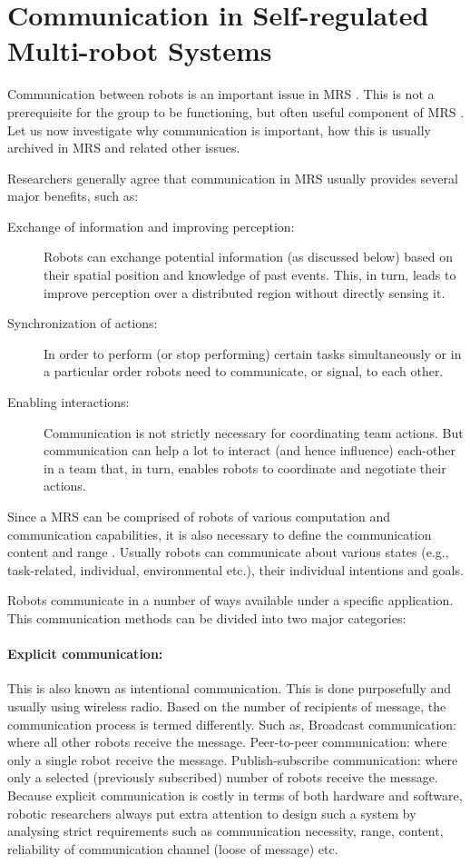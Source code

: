 \section{Communication in Self-regulated Multi-robot Systems}
Communication between robots is an  important issue in MRS \cite{Arkin1998}. This is not a prerequisite for the group to be functioning, but often useful component of MRS \cite{Mataric2007}. Let us now investigate why communication is important, how this is usually archived in MRS and related other issues.

Researchers generally agree that communication in MRS usually provides several major benefits, such as:

\begin{description}
\item[Exchange of information and improving perception:]
Robots  can exchange potential information (as discussed below) based on their spatial position and knowledge of past events. This, in turn, leads to improve perception over a distributed region without directly sensing it.
\item[Synchronization of actions:]
In order to perform (or stop performing) certain tasks simultaneously or in a particular order robots need to communicate, or signal, to each other. 
\item[Enabling interactions:]
Communication is not strictly necessary for coordinating team actions. But  communication can help a lot to interact (and hence influence) each-other in a team that, in turn, enables robots to coordinate and negotiate their actions.
\end{description}

Since a MRS  can be comprised of robots of various computation and communication capabilities, it is also necessary to define the communication content and range \cite{Arkin1998,Mataric2007}. Usually robots can communicate about various states (e.g., task-related, individual, environmental etc.), their individual intentions and goals. 
 
Robots communicate in a number of ways available under a specific application. This communication methods can be divided into two major categories:

\paragraph{Explicit communication:}
This is also known as intentional communication. This is done purposefully and usually using wireless radio. Based on the number of recipients of message, the communication process is termed differently. Such as,
Broadcast communication: where all other robots receive the message.
Peer-to-peer communication: where only a single robot receive the message.
Publish-subscribe communication: where only a selected (previously subscribed) number of robots receive the message.
Because explicit communication is costly in terms of both hardware and software, robotic researchers always put extra attention to design such a system by analysing strict requirements such as communication necessity, range, content, reliability of communication channel (loose of message) etc.

